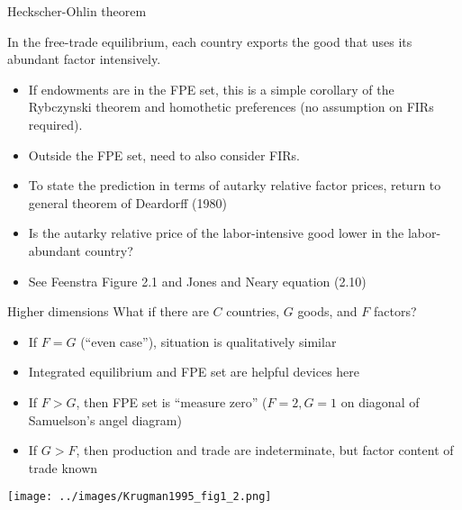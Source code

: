 \documentclass[10pt,notes=hide]{beamer}
\begin{document}
\begin{frame}{Heckscher-Ohlin theorem}
\begin{theorem}
	In the free-trade equilibrium, each country exports the good that uses its abundant factor intensively.
\end{theorem}
\begin{itemize}
	\item If endowments are in the FPE set, this is a simple corollary of the Rybczynski theorem and homothetic preferences (no assumption on FIRs required).
	\item Outside the FPE set, need to also consider FIRs.
	\item To state the prediction in terms of autarky relative factor prices, return to general theorem of Deardorff (1980)
	\item Is the autarky relative price of the labor-intensive good lower in the labor-abundant country?
	\item See Feenstra Figure 2.1 and Jones and Neary equation (2.10)
\end{itemize}
\end{frame}
\begin{frame}{Higher dimensions}
What if there are $C$ countries, $G$ goods, and $F$ factors?
\begin{itemize}
	\item If $F=G$ (``even case''), situation is qualitatively similar
	\item Integrated equilibrium and FPE set are helpful devices here
	\item If $F>G$, then FPE set is ``measure zero'' ($F=2,G=1$ on diagonal of Samuelson's angel diagram)
	\item If $G>F$, then production and trade are indeterminate, but factor content of trade known
\end{itemize}
\begin{center}\texttt{[image: ../images/Krugman1995\_fig1\_2.png]}\end{center}
\end{frame}
\end{document}
